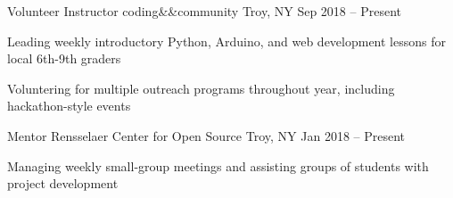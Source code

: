 


\begin{cventries}

  \cventry
  {Volunteer Instructor}
  {coding\&\&community}
  {Troy, NY}
  {Sep 2018 -- Present}
  {
    \begin{cvitems}
      \item Leading weekly introductory Python, Arduino, and web development lessons for local 6th-9th graders
      \item Voluntering for multiple outreach programs throughout year, including hackathon-style events
    \end{cvitems}
  }


  \cventry
  {Mentor}
  {Rensselaer Center for Open Source}
  {Troy, NY}
  {Jan 2018 -- Present}
  {
    \begin{cvitems}
      \item Managing weekly small-group meetings and assisting groups of students with project development
    \end{cvitems}
  }



\end{cventries}
